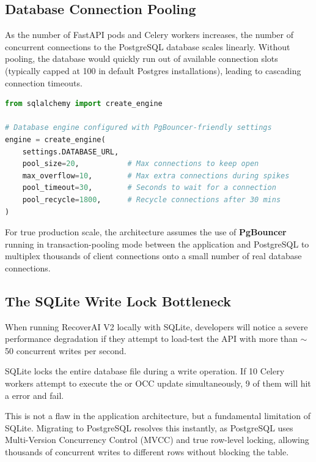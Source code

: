 \vspace{0.8cm}

\subsection{Database Connection Pooling}

As the number of FastAPI pods and Celery workers increases, the number of concurrent connections to the PostgreSQL database scales linearly. Without pooling, the database would quickly run out of available connection slots (typically capped at 100 in default Postgres installations), leading to cascading connection timeouts.

\begin{tcolorbox}[codebox={SQLAlchemy Connection Pooling}]
\begin{lstlisting}[language=Python]
from sqlalchemy import create_engine

# Database engine configured with PgBouncer-friendly settings
engine = create_engine(
    settings.DATABASE_URL,
    pool_size=20,           # Max connections to keep open
    max_overflow=10,        # Max extra connections during spikes
    pool_timeout=30,        # Seconds to wait for a connection
    pool_recycle=1800,      # Recycle connections after 30 mins
)
\end{lstlisting}
\end{tcolorbox}

For true production scale, the architecture assumes the use of \textbf{PgBouncer} running in transaction-pooling mode between the application and PostgreSQL to multiplex thousands of client connections onto a small number of real database connections.

\vspace{0.8cm}

\subsection{The SQLite Write Lock Bottleneck}

\begin{tcolorbox}[warningbox={The Dev-Environment Ceiling}]
When running RecoverAI V2 locally with SQLite, developers will notice a severe performance degradation if they attempt to load-test the API with more than $\sim$50 concurrent writes per second.
\end{tcolorbox}

SQLite locks the entire database file during a write operation. If 10 Celery workers attempt to execute the  or OCC update simultaneously, 9 of them will hit a  error and fail. 

This is not a flaw in the application architecture, but a fundamental limitation of SQLite. Migrating to PostgreSQL resolves this instantly, as PostgreSQL uses Multi-Version Concurrency Control (MVCC) and true row-level locking, allowing thousands of concurrent writes to different rows without blocking the table.
